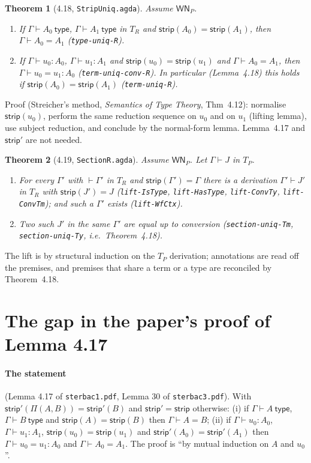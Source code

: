 \documentclass[10pt]{article}
\newcommand{\strip}{\mathsf{strip}}
\newcommand{\ty}{\ \mathsf{type}}
\newcommand{\TR}{T_R}
\newcommand{\TP}{T_P}
\newcommand{\WN}{\mathsf{WN}_P}
\newcommand{\agda}[1]{\texttt{#1}}
\newtheorem{theorem}{Theorem}
\theoremstyle{remark}
\begin{document}
\begin{theorem}[4.18, \agda{StripUniq.agda}]
Assume $\WN$.
\begin{enumerate}
\item If $\Gamma\vdash A_0\ty$, $\Gamma\vdash A_1\ty$ in $\TR$ and
  $\strip(A_0)=\strip(A_1)$, then $\Gamma\vdash A_0=A_1$
  (\agda{type-uniq-R}).
\item If $\Gamma\vdash u_0:A_0$, $\Gamma\vdash u_1:A_1$ and
  $\strip(u_0)=\strip(u_1)$ and $\Gamma\vdash A_0=A_1$, then
  $\Gamma\vdash u_0=u_1:A_0$ (\agda{term-uniq-conv-R}).  In particular
  (Lemma~4.18) this holds if $\strip(A_0)=\strip(A_1)$ (\agda{term-uniq-R}).
\end{enumerate}
\end{theorem}
\noindent
Proof (Streicher's method, \emph{Semantics of Type Theory}, Thm~4.12):
normalise $\strip(u_0)$, perform the same reduction sequence on $u_0$ and on
$u_1$ (lifting lemma), use subject reduction, and conclude by the normal-form
lemma.  Lemma~4.17 and $\strip'$ are not needed.

\begin{theorem}[4.19, \agda{SectionR.agda}]
Assume $\WN$.  Let $\Gamma\vdash J$ in $\TP$.
\begin{enumerate}
\item For every $\Gamma'$ with $\vdash\Gamma'$ in $\TR$ and
  $\strip(\Gamma')=\Gamma$ there is a derivation $\Gamma'\vdash J'$ in $\TR$
  with $\strip(J')=J$ (\agda{lift-IsType}, \agda{lift-HasType},
  \agda{lift-ConvTy}, \agda{lift-ConvTm}); and such a $\Gamma'$ exists
  (\agda{lift-WfCtx}).
\item Two such $J'$ in the same $\Gamma'$ are equal up to conversion
  (\agda{section-uniq-Tm}, \agda{section-uniq-Ty}, i.e.\ Theorem~4.18).
\end{enumerate}
\end{theorem}
\noindent
The lift is by structural induction on the $\TP$ derivation; annotations
are read off the premises, and premises that share a term or a type are
reconciled by Theorem~4.18.

\section{The gap in the paper's proof of Lemma 4.17}\label{sec:gap}

\paragraph{The statement} (Lemma 4.17 of \texttt{sterbac1.pdf}, Lemma 30 of
\texttt{sterbac3.pdf}).  With $\strip'(\Pi(A,B))=\strip'(B)$ and $\strip'=\strip$
otherwise: (i) if $\Gamma\vdash A\ty$, $\Gamma\vdash B\ty$ and
$\strip(A)=\strip(B)$ then $\Gamma\vdash A=B$; (ii) if
$\Gamma\vdash u_0:A_0$, $\Gamma\vdash u_1:A_1$, $\strip(u_0)=\strip(u_1)$ and
$\strip'(A_0)=\strip'(A_1)$ then $\Gamma\vdash u_0=u_1:A_0$ and
$\Gamma\vdash A_0=A_1$.  The proof is ``by mutual induction on $A$ and $u_0$''.
\end{document}
